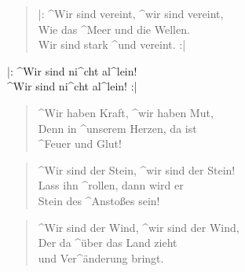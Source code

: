 \documentclass{leadsheet}
\begin{document}
\begin{song}
\begin{multicols}{2}
    \begin{verse}
     |: ^Wir sind vereint, ^wir sind vereint, \\
      Wie das ^Meer und die Wellen. \\
      Wir sind stark ^und vereint. :|
    \end{verse}  
    \begin{chorus}[format={\itshape}]
      |: ^Wir sind ni^cht al^lein! \\
      ^Wir sind ni^cht al^lein! :|
    \end{chorus}
    \columnbreak
    \begin{verse}
      ^Wir haben Kraft, ^wir haben Mut, \\
      Denn in ^unserem Herzen, da ist \\
      ^Feuer und Glut!
    \end{verse}  
    \begin{chorus}[after-label=]\end{chorus}
    \begin{verse}
      ^Wir sind der Stein, ^wir sind der Stein! \\
      Lass ihn ^rollen, dann wird er \\
      Stein des ^Anstoßes sein!
    \end{verse}  
    \begin{chorus}[after-label=]\end{chorus}
    \begin{verse}
      ^Wir sind der Wind, ^wir sind der Wind, \\
      Der da ^über das Land zieht \\
      und Ver^änderung bringt.
    \end{verse}  
    \begin{chorus}[after-label=]\end{chorus}
  \end{multicols}
\end{song}
\end{document}
